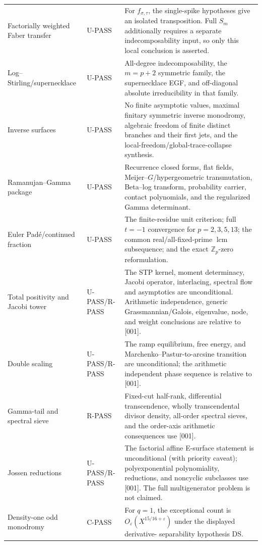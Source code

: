 \documentclass[11pt]{article}
\theoremstyle{keio}
\theoremstyle{definition}
\theoremstyle{remark}
\newcommand{\Z}{\mathbb Z}
\newcommand{\UPASS}{\textcolor{keiogreen}{\textsf{U-PASS}}}
\newcommand{\RPASS}{\textcolor{keioxblue}{\textsf{R-PASS}}}
\newcommand{\CPASS}{\textcolor{keioviolet}{\textsf{C-PASS}}}
\begin{document}
\begin{longtable}{@{}p{}p{}p{}@{}}
Factorially weighted Faber transfer&\UPASS&
For \(f_{\sigma,\tau}\), the single-spike hypotheses give an isolated
transposition.  Full \(S_m\) additionally requires a separate
indecomposability input, so only this local conclusion is asserted.\\

Log--Stirling/supernecklace&\UPASS&
All-degree indecomposability, the \(m=p+2\) symmetric family, the
supernecklace EGF, and off-diagonal absolute irreducibility in that family.\\

Inverse surfaces&\UPASS&
No finite asymptotic values, maximal finitary symmetric inverse monodromy,
algebraic freedom of finite distinct branches and their first jets, and the
local-freedom/global-trace-collapse synthesis.\\

Ramanujan--Gamma package&\UPASS&
Recurrence closed forms, flat fields, Meijer--\(G\)/hypergeometric
transmutation, Beta--log transform, probability carrier, contact
polynomials, and the regularized Gamma determinant.\\

Euler Pad\'e/continued fraction&\UPASS&
The finite-residue unit criterion; full \(t=-1\) convergence for
\(p=2,3,5,13\); the common real/all-fixed-prime \(\operatorname{lcm}\)
subsequence; and the exact \(\Z_p\)-zero reformulation.\\

Total positivity and Jacobi tower&\UPASS/\RPASS&
The STP kernel, moment determinacy, Jacobi operator, interlacing, spectral
flow and asymptotics are unconditional.  Arithmetic independence, generic
Grassmannian/Galois, eigenvalue, node, and weight conclusions are relative
to [001].\\

Double scaling&\UPASS/\RPASS&
The ramp equilibrium, free energy, and Marchenko--Pastur-to-arcsine
transition are unconditional; the arithmetic independent phase sequence is
relative to [001].\\

Gamma-tail and spectral sieve&\RPASS&
Fixed-cut half-rank, differential transcendence, wholly transcendental
divisor density, all-order spectral sieves, and the order-axis arithmetic
consequences use [001].\\

Jossen reductions&\UPASS/\RPASS&
The factorial affine E-surface statement is unconditional (with priority
caveat); polyexponential polynomiality, reductions, and noncyclic subclasses
use [001].  The full multigenerator problem is not claimed.\\

Density-one odd monodromy&\CPASS&
For \(q=1\), the exceptional count is
\(O_\varepsilon(X^{15/16+\varepsilon})\) under the displayed derivative-
separability hypothesis DS.\\
\bottomrule
\end{longtable}
\end{document}
